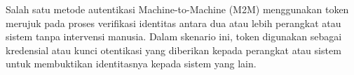 Salah satu metode autentikasi Machine-to-Machine (M2M) menggunakan token merujuk pada proses verifikasi identitas antara dua atau lebih perangkat atau sistem tanpa intervensi manusia. Dalam skenario ini, token digunakan sebagai kredensial atau kunci otentikasi yang diberikan kepada perangkat atau sistem untuk membuktikan identitasnya kepada sistem yang lain.
